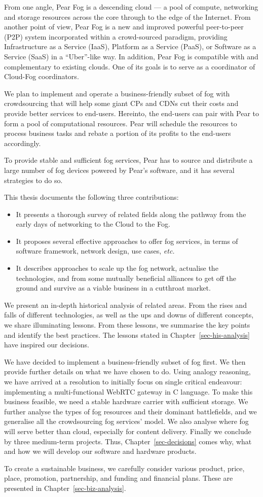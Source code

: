 From one angle, Pear Fog is a descending cloud --- a pool of compute, networking and storage resources across the core through to the edge of the Internet. From another point of view, Pear Fog is a new and improved powerful peer-to-peer (P2P) system incorporated within a crowd-sourced paradigm, providing Infrastructure as a Service (IaaS), Platform as a Service (PaaS), or Software as a Service (SaaS) in a ``Uber''-like way. 
In addition, Pear Fog is compatible with and complementary to existing clouds. One of its goals is to serve as a coordinator of Cloud-Fog coordinators. 

We plan to implement and operate a business-friendly subset of fog with crowdsourcing that will help some giant CPs and CDNs cut their costs and provide better services to end-users. Hereinto, the end-users can pair with Pear to form a pool of computational resources. 
Pear will schedule the resources to process business tasks and rebate a portion of its profits to the end-users accordingly. 

To provide stable and sufficient fog services, Pear has to source and distribute a large number of fog devices powered by Pear's software, and it has several strategies to do so. %

This thesis documents the following three contributions:
\begin{itemize}
	\item It presents a thorough survey of related fields along the pathway from the early days of networking to the Cloud to the Fog. 
	\item It proposes several effective approaches to offer fog services, in terms of software framework, network design, use cases, {\em etc.}
	\item It describes approaches to scale up the fog network, actualise the technologies, and from some mutually beneficial alliances to get off the ground and survive as a viable business in a cutthroat market. 
\end{itemize} 

We present an in-depth historical analysis of related areas. From the rises and falls of different technologies, as well as the ups and downs of different concepts, we share illuminating lessons. From these lessons, we summarise the key points and identify the best practices.   
The lessons stated in Chapter~\ref{sec-his-analysis} have inspired our decisions. 

We have decided to implement a business-friendly subset of fog first. We then provide further details on what we have chosen to do. Using analogy reasoning, we have arrived at a resolution to initially focus on single critical endeavour: implementing a multi-functional WebRTC gateway in C language. To make this business feasible, we need a stable hardware carrier with sufficient storage. We further analyse the types of fog resources and their dominant battlefields, and we generalise all the crowdsourcing fog services' model. We also analyse where fog will serve better than cloud, especially for content delivery. Finally we conclude by three medium-term projects. Thus, Chapter~\ref{sec-decisions} comes why, what and how we will develop our software and hardware products. 

To create a sustainable business, we carefully consider various product, price, place, promotion, partnership, and funding and financial plans. These are presented in Chapter~\ref{sec-biz-analysis}. 
